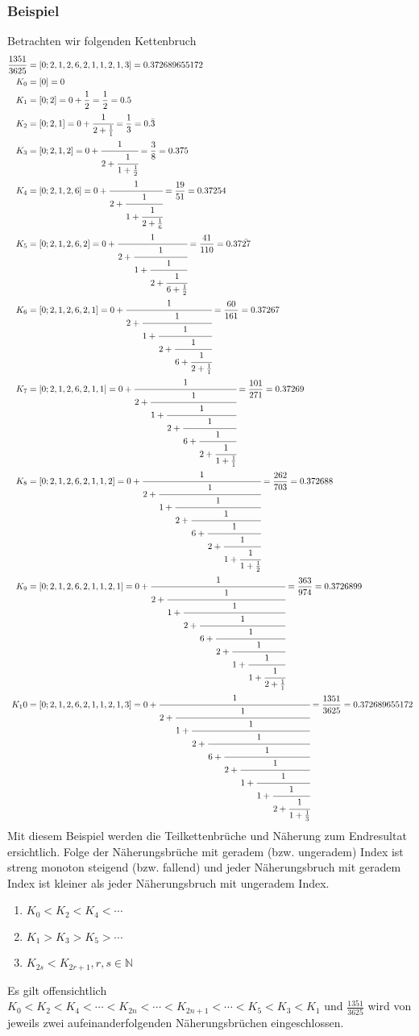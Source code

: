\subsubsection{Beispiel}
\begin{beispiel}
Betrachten wir folgenden Kettenbruch
\begin{align*}
\frac{1351}{3625} &= [0;2,1,2,6,2,1,1,2,1,3] = 0.372689655172
\\
	K_0 &= [0] = 0
\\
	K_1 &= [0;2] = 0 + \frac{1}{2} = \frac{1}{2} = 0.5
\\
	K_2 &= [0;2,1] = 0 + \cfrac{1}{2+\frac{1}{1}} = \frac{1}{3} = 0.\bar{3}
\\
	K_3 &= [0;2,1,2] = 0 + \cfrac{1}{2+\cfrac{1}{1+\frac{1}{2}}} = \frac{3}{8} = 0.375
\\
	K_4 &= [0;2,1,2,6] = 0 + \cfrac{1}{2+\cfrac{1}{1+\cfrac{1}{2+\frac{1}{6}}}} = \frac{19}{51} =0.37254
\\
	K_5 &= [0;2,1,2,6,2] = 0 + \cfrac{1}{2+\cfrac{1}{1+\cfrac{1}{2+\cfrac{1}{6+\frac{1}{2}}}}} = \frac{41}{110} = 0.37\bar{27}
\\
	K_6 &= [0;2,1,2,6,2,1] = 0 + \cfrac{1}{2+\cfrac{1}{1+\cfrac{1}{2+\cfrac{1}{6+\cfrac{1}{2+\frac{1}{1}}}}}} = \frac{60}{161} = 0.37267
\\
	K_7 &= [0;2,1,2,6,2,1,1] = 0 + \cfrac{1}{2+\cfrac{1}{1+\cfrac{1}{2+\cfrac{1}{6+\cfrac{1}{2+\cfrac{1}{1+\frac{1}{1}}}}}}} = \frac{101}{271} = 0.37269
\\
	K_8 &= [0;2,1,2,6,2,1,1,2] = 0 + \cfrac{1}{2+\cfrac{1}{1+\cfrac{1}{2+\cfrac{1}{6+\cfrac{1}{2+\cfrac{1}{1+\cfrac{1}{1+\frac{1}{2}}}}}}}} = \frac{262}{703} = 0.372688
\\
	K_9 &= [0;2,1,2,6,2,1,1,2,1] = 0 + \cfrac{1}{2+\cfrac{1}{1+\cfrac{1}{2+\cfrac{1}{6+\cfrac{1}{2+\cfrac{1}{1+\cfrac{1}{1+\cfrac{1}{2+\frac{1}{1}}}}}}}}} = \frac{363}{974} = 0.3726899
\\
	K_10 &= [0;2,1,2,6,2,1,1,2,1,3] = 0 + \cfrac{1}{2+\cfrac{1}{1+\cfrac{1}{2+\cfrac{1}{6+\cfrac{1}{2+\cfrac{1}{1+\cfrac{1}{1+\cfrac{1}{2+\cfrac{1}{1+\frac{1}{3}}}}}}}}}} = \frac{1351}{3625} = 0.372689655172
\end{align*}
Mit diesem Beispiel werden die Teilkettenbrüche und Näherung zum Endresultat ersichtlich.
Folge der Näherungsbrüche mit geradem (bzw. ungeradem) Index
ist streng monoton steigend (bzw. fallend) und jeder Näherungsbruch
mit geradem Index ist kleiner als jeder Näherungsbruch mit ungeradem Index\cite{kettenbruch:proseminar}.
\begin{enumerate}
\item
$K_0 < K_2 < K_4 < \cdots$
\item
$K_1 > K_3 > K_5 > \cdots$
\item
$K_{2s} < K_{2r+1}, r,s \in \mathbb{N}$
\end{enumerate}

Es gilt offensichtlich
$K_0 < K_2 < K_4 < \cdots < K_{2n} < \cdots < K_{2n+1} < \cdots < K_5
< K_3 < K_1$
und $\frac{1351}{3625}$ wird von jeweils zwei aufeinanderfolgenden
Näherungsbrüchen eingeschlossen.
\end{beispiel}

